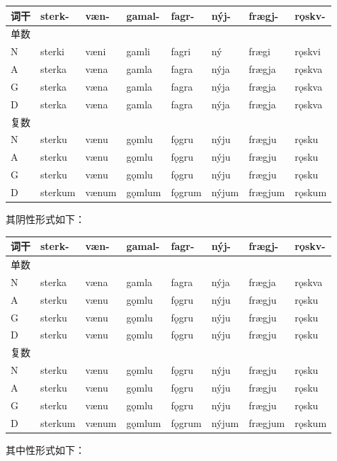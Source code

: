 \begin{longtable}{llllllll}
\toprule
词干 & sterk- & væn- & gamal- & fagr- & nýj- & frægj- & rǫskv- \\
\midrule
\endhead
\bottomrule
\endfoot
单数 & & & & & & & \\
N & sterki & væni & gamli & fagri & ný & frægi & rǫskvi \\
A & sterka & væna & gamla & fagra & nýja & frægja & rǫskva \\
G & sterka & væna & gamla & fagra & nýja & frægja & rǫskva \\
D & sterka & væna & gamla & fagra & nýja & frægja & rǫskva \\
复数 & & & & & & & \\
N & sterku & vænu & gǫmlu & fǫgru & nýju & frægju & rǫsku \\
A & sterku & vænu & gǫmlu & fǫgru & nýju & frægju & rǫsku \\
G & sterku & vænu & gǫmlu & fǫgru & nýju & frægju & rǫsku \\
D & sterkum & vænum & gǫmlum & fǫgrum & nýjum & frægjum & rǫskum \\
\end{longtable}

其阴性形式如下：

\begin{longtable}{llllllll}
\toprule
词干 & sterk- & væn- & gamal- & fagr- & nýj- & frægj- & rǫskv- \\
\midrule
\endhead
\bottomrule
\endfoot
单数 & & & & & & & \\
N & sterka & væna & gamla & fagra & nýja & frægja & rǫskva \\
A & sterku & vænu & gǫmlu & fǫgru & nýju & frægju & rǫsku \\
G & sterku & vænu & gǫmlu & fǫgru & nýju & frægju & rǫsku \\
D & sterku & vænu & gǫmlu & fǫgru & nýju & frægju & rǫsku \\
复数 & & & & & & & \\
N & sterku & vænu & gǫmlu & fǫgru & nýju & frægju & rǫsku \\
A & sterku & vænu & gǫmlu & fǫgru & nýju & frægju & rǫsku \\
G & sterku & vænu & gǫmlu & fǫgru & nýju & frægju & rǫsku \\
D & sterkum & vænum & gǫmlum & fǫgrum & nýjum & frægjum & rǫskum \\
\end{longtable}

其中性形式如下：

